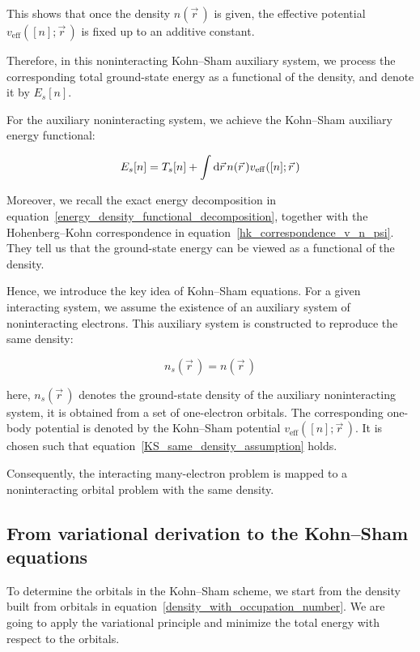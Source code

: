 This shows that once the density $n(\vec{r}\,)$ is given, the effective potential $v_\mathrm{eff}([n];\vec{r}\,)$ is fixed up to an additive constant.

Therefore, in this noninteracting Kohn--Sham auxiliary system, we process the corresponding total ground-state energy as a functional of the density, and denote it by $E_s[n]$.

For the auxiliary noninteracting system, we achieve the Kohn--Sham auxiliary energy functional:

\begin{equation}
    E_s[n]=T_s[n]+\int\mathrm{d}{\vec{r}}\,n(\vec{r}\,)v_\mathrm{eff}([n];\vec{r}\,)
\label{KS_auxiliary_energy_functional}
\end{equation}

Moreover, we recall the exact energy decomposition in equation~\eqref{energy_density_functional_decomposition},
together with the Hohenberg--Kohn correspondence in equation~\eqref{hk_correspondence_v_n_psi}.
They tell us that the ground-state energy can be viewed as a functional of the density.

Hence, we introduce the key idea of Kohn--Sham equations.
For a given interacting system, we assume the existence of an auxiliary system of noninteracting electrons.
This auxiliary system is constructed to reproduce the same density:

\begin{equation}
    n_s(\vec{r}\,)=n(\vec{r}\,)
\label{KS_same_density_assumption}
\end{equation}

here, $n_s(\vec{r}\,)$ denotes the ground-state density of the auxiliary noninteracting system,
it is obtained from a set of one-electron orbitals.
The corresponding one-body potential is denoted by the Kohn--Sham potential $v_\mathrm{eff}([n];\vec{r}\,)$.
It is chosen such that equation~\eqref{KS_same_density_assumption} holds.

Consequently, the interacting many-electron problem is mapped to a noninteracting orbital problem with the same density.

\subsection{From variational derivation to the Kohn--Sham equations}

To determine the orbitals in the Kohn--Sham scheme,
we start from the density built from orbitals in equation~\eqref{density_with_occupation_number}.
We are going to apply the variational principle and minimize the total energy with respect to the orbitals.

